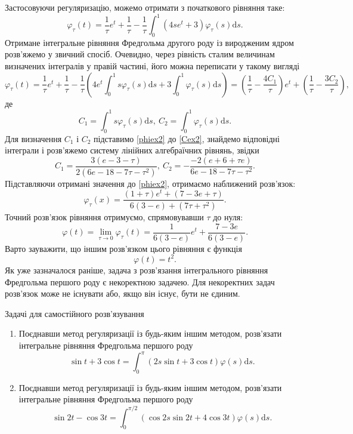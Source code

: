 \documentclass[14pt,twoside]{extreport}
\theoremstyle{mystyle}
\newcommand{\problems}{\bigskip\noindent\fbox{\HandPencilLeft}\hspace{6pt}\textsf{Задачі
		для самостійного розв'язування}}
\numberwithin{equation}{chapter}
\begin{document}
\begin{small}
Застосовуючи регуляризацію, можемо отримати з початкового рівняння таке:
\begin{equation}
	\varphi_{\tau}(t)=\displaystyle \frac{1}{\tau}e^{t}+\frac{1}{\tau}-\frac{1}{\tau}\int_{0}^{1}(4se^{t}+3)\varphi_{\tau}(s)\mathrm{d}s.
\end{equation}
Отримане інтегральне рівняння Фредгольма другого роду із виродженим  ядром розв'яжемо у звичний спосіб. Очевидно, через рівність сталим величинам визначених інтегралів у правій частині, його можна переписати у такому вигляді
\begin{equation}\label{phiex2}
	\varphi_{\tau}(t)=\frac{1}{\tau}e^{t}+\frac{1}{\tau}-\frac{1}{\tau}\left(4e^{t}\int_{0}^{1}s\varphi_{\tau}(s)\mathrm{d}s + 3\int_{0}^{1}\varphi_{\tau}(s)\mathrm{d}s\right) = \left(\displaystyle \frac{1}{\tau}-\frac{4C_1}{\tau}\right)e^{t}+\left(\frac{1}{\tau}-\frac{3C_2}{\tau}\right),
\end{equation}
де
\begin{equation}\label{Cex2}
	\displaystyle C_1=\int_{0}^{1}s\varphi_{\tau}(s)\mathrm{d}s,\ C_2=\int_{0}^{1}\varphi_{\tau}(s)\mathrm{d}s.
\end{equation}
Для визначення $C_1$ і $C_2$ підставимо \eqref{phiex2} до \eqref{Cex2}, знайдемо відповідні інтеграли і розв'яжемо систему лінійних алгебраїчних рівнянь, звідки
\[
\displaystyle C_1=\frac{3(e-3-\tau)}{2(6e-18-7\tau-\tau^{2})},\ C_2=-\frac{-2(e+6+\tau e)}{6e-18-7\tau-\tau^{2}}.
\]
Підставляючи отримані значення до \eqref{phiex2}, отримаємо наближений розв'язок:
\[
\varphi_{\tau}(x)=\displaystyle \frac{(1+\tau)e^{t}+(7-3e+\tau)}{6(3-e)+(7\tau+\tau^{2})}.
\]
Точний розв'язок рівняння отримуємо, спрямовувавши $\tau$ до нуля:
\[
\varphi(t)=\displaystyle \lim_{\tau\to 0}\varphi_{\tau}(t)=\frac{1}{6(3-e)}e^{t}+\frac{7-3e}{6(3-e)}.
\]
Варто зауважити, що іншим розв'язком цього рівняння є функція
\[
\varphi(t)=t^{2}.
\]
Як уже зазначалося раніше, задача з розв'язання інтегрального рівняння Фредгольма першого роду є некоректною задачею. Для некоректних задач розв'язок може не існувати або, якщо він існує, бути не єдиним.

\problems
\begin{enumerate}
	\item Поєднавши метод регуляризації із будь-яким іншим методом, розв'язати інтегральне рівняння Фредгольма першого роду
	\[
	   \sin t + 3\cos t = \displaystyle \int_{0}^{\pi}(2s \sin t + 3\cos t)\varphi(s)\mathrm{d}s.
	\]
	\item Поєднавши метод регуляризації із будь-яким іншим методом, розв'язати інтегральне рівняння Фредгольма першого роду
	\[
	   \sin 2t - \cos 3t = \displaystyle \int_{0}^{\pi/2}(\cos 2s \sin 2t + 4\cos 3t)\varphi(s)\mathrm{d}s.
	\]
\end{enumerate} 
\end{small}
\end{document}
